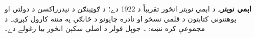 \textbf{اېمي نوېتر۔} د اېمي نوېتر انځور تقريباً د 1922 دے؛ د ګوټېنګن د نيدرزاكسن د دولتي او پوهنتوني کتابتون د قلمي نسخو او نادره چاپونو د څانګې په مننه کارول کېږي۔ د مجموعې کره نښه: ۔ جوېل فولر د اصلي سکېن انځور بيا رغولے دے۔
